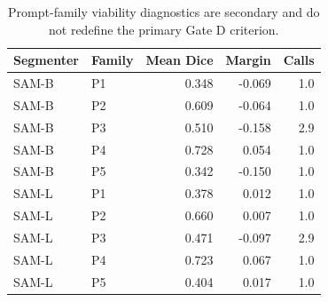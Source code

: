 \begin{table}[t]
\centering
\caption{Prompt-family viability diagnostics are secondary and do not redefine the primary Gate D criterion.}
\begin{tabular}{llrrr}
\hline
Segmenter & Family & Mean Dice & Margin & Calls \\
\hline
SAM-B & P1 & 0.348 & -0.069 & 1.0 \\
SAM-B & P2 & 0.609 & -0.064 & 1.0 \\
SAM-B & P3 & 0.510 & -0.158 & 2.9 \\
SAM-B & P4 & 0.728 & 0.054 & 1.0 \\
SAM-B & P5 & 0.342 & -0.150 & 1.0 \\
SAM-L & P1 & 0.378 & 0.012 & 1.0 \\
SAM-L & P2 & 0.660 & 0.007 & 1.0 \\
SAM-L & P3 & 0.471 & -0.097 & 2.9 \\
SAM-L & P4 & 0.723 & 0.067 & 1.0 \\
SAM-L & P5 & 0.404 & 0.017 & 1.0 \\
\hline
\end{tabular}
\end{table}
